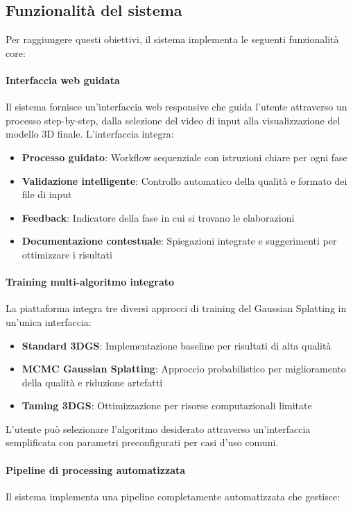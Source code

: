 \subsection{Funzionalità del sistema}
Per raggiungere questi obiettivi, il sistema implementa le seguenti funzionalità core:

\paragraph{Interfaccia web guidata}
Il sistema fornisce un'interfaccia web responsive che guida l'utente attraverso un processo step-by-step, dalla selezione del video di input alla visualizzazione del modello 3D finale. L'interfaccia integra:

\begin{itemize}
\item \textbf{Processo guidato}: Workflow sequenziale con istruzioni chiare per ogni fase
\item \textbf{Validazione intelligente}: Controllo automatico della qualità e formato dei file di input
\item \textbf{Feedback}: Indicatore della fase in cui si trovano le elaborazioni
\item \textbf{Documentazione contestuale}: Spiegazioni integrate e suggerimenti per ottimizzare i risultati
\end{itemize}

\paragraph{Training multi-algoritmo integrato}
La piattaforma integra tre diversi approcci di training del Gaussian Splatting in un'unica interfaccia:

\begin{itemize}
\item \textbf{Standard 3DGS}: Implementazione baseline per risultati di alta qualità
\item \textbf{MCMC Gaussian Splatting}: Approccio probabilistico per miglioramento della qualità e riduzione artefatti
\item \textbf{Taming 3DGS}: Ottimizzazione per risorse computazionali limitate
\end{itemize}

L'utente può selezionare l'algoritmo desiderato attraverso un'interfaccia semplificata con parametri preconfigurati per casi d'uso comuni.

\paragraph{Pipeline di processing automatizzata}
Il sistema implementa una pipeline completamente automatizzata che gestisce:

